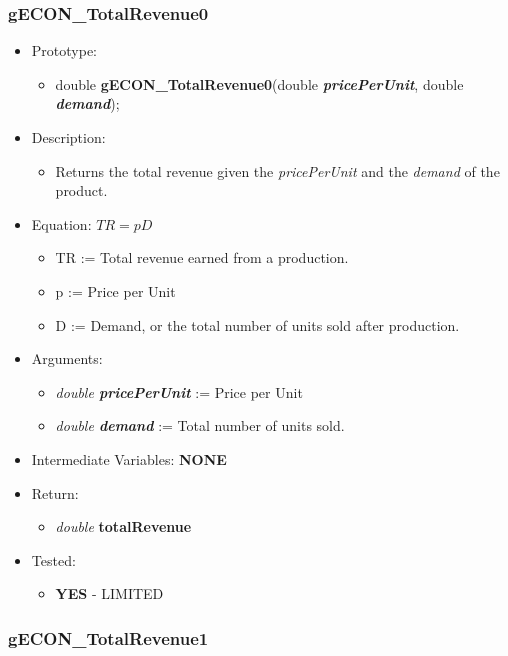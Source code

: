 \documentclass{article}
\begin{document}
{{{{{{%
\cleardoublepage
\subsubsection{gECON\_TotalRevenue0}

\begin{itemize}
\item Prototype:
	\begin{itemize}
	\item double \textbf{gECON\_TotalRevenue0}(double \textbf{\textit{pricePerUnit}}, double \textbf{\textit{demand}});
	\end{itemize}
\item Description:
	\begin{itemize}
	\item Returns the total revenue given the \textit{pricePerUnit} and the \textit{demand} of the product.
	\end{itemize}
\item Equation:     $TR = pD$
	\begin{itemize}[noitemsep]
	\item TR := Total revenue earned from a production.
	\item p := Price per Unit
	\item D := Demand, or the total number of units sold after production.
	\end{itemize}
\item Arguments:
	\begin{itemize}[noitemsep]
	\item \textit{double \textbf{pricePerUnit}} := Price per Unit
	\item \textit{double \textbf{demand}} := Total number of units sold.
	\end{itemize} 
\item Intermediate Variables: \textbf{NONE}
\item Return:
	\begin{itemize}
	\item \textit{double} \textbf{totalRevenue}
	\end{itemize}
\item Tested:
	\begin{itemize}
	\item \textbf{YES} - LIMITED
	\end{itemize}
\end{itemize}

\cleardoublepage
\subsubsection{gECON\_TotalRevenue1}

}}}}}}
\end{document}
